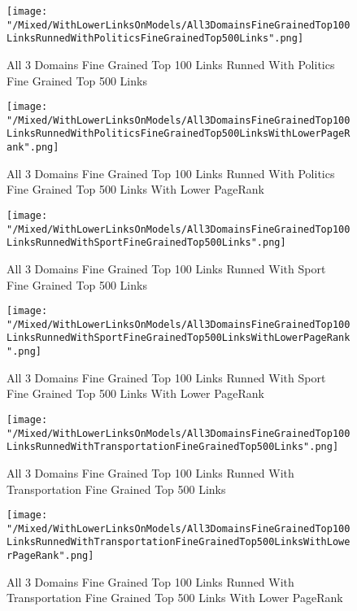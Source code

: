 \documentclass[thesis=M,english]{FITthesis}[2018/05/30]
\begin{document}
	\begin{figure}\centering
		\texttt{[image: "/Mixed/WithLowerLinksOnModels/All3DomainsFineGrainedTop100LinksRunnedWithPoliticsFineGrainedTop500Links".png]}
		\caption{All 3 Domains Fine Grained Top 100 Links Runned With Politics Fine Grained Top 500 Links}\label{}
	\end{figure}
	
	\begin{figure}\centering
		\texttt{[image: "/Mixed/WithLowerLinksOnModels/All3DomainsFineGrainedTop100LinksRunnedWithPoliticsFineGrainedTop500LinksWithLowerPageRank".png]}
		\caption{All 3 Domains Fine Grained Top 100 Links Runned With Politics Fine Grained Top 500 Links With Lower PageRank}\label{}
	\end{figure}
	
	\begin{figure}\centering
		\texttt{[image: "/Mixed/WithLowerLinksOnModels/All3DomainsFineGrainedTop100LinksRunnedWithSportFineGrainedTop500Links".png]}
		\caption{All 3 Domains Fine Grained Top 100 Links Runned With Sport Fine Grained Top 500 Links}\label{}
	\end{figure}
	
	\begin{figure}\centering
		\texttt{[image: "/Mixed/WithLowerLinksOnModels/All3DomainsFineGrainedTop100LinksRunnedWithSportFineGrainedTop500LinksWithLowerPageRank".png]}
		\caption{All 3 Domains Fine Grained Top 100 Links Runned With Sport Fine Grained Top 500 Links With Lower PageRank}\label{}
	\end{figure}
	
	\begin{figure}\centering
		\texttt{[image: "/Mixed/WithLowerLinksOnModels/All3DomainsFineGrainedTop100LinksRunnedWithTransportationFineGrainedTop500Links".png]}
		\caption{All 3 Domains Fine Grained Top 100 Links Runned With Transportation Fine Grained Top 500 Links}\label{}
	\end{figure}

	\begin{figure}\centering
		\texttt{[image: "/Mixed/WithLowerLinksOnModels/All3DomainsFineGrainedTop100LinksRunnedWithTransportationFineGrainedTop500LinksWithLowerPageRank".png]}
		\caption{All 3 Domains Fine Grained Top 100 Links Runned With Transportation Fine Grained Top 500 Links With Lower PageRank}\label{}
	\end{figure}
	
\end{document}
